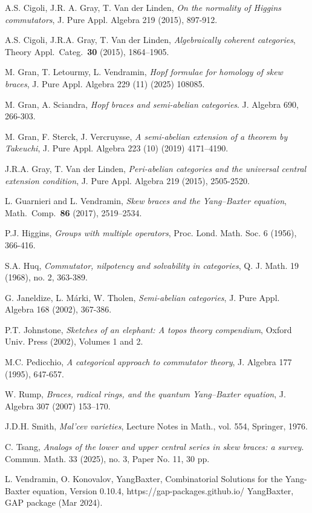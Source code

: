 \documentclass{amsart}
\theoremstyle{definition}
\begin{document}
\begin{thebibliography}{}
A.S. Cigoli, J.R. A. Gray, T. Van der Linden, 
\emph{On the normality of Higgins commutators}, J. Pure Appl. Algebra 219 (2015), 897-912.

A.S. Cigoli, J.R.A. Gray, T. Van der Linden,
\emph{Algebraically coherent categories},
Theory Appl.\ Categ.\ \textbf{30} (2015), 1864--1905.

M. Gran, T. Letourmy, L. Vendramin, 
\emph{Hopf formulae for homology of skew braces}, J. Pure Appl. Algebra 229 (11) (2025) 108085.

M. Gran, A. Sciandra, 
\emph{Hopf braces and semi-abelian categories}. J. Algebra 690, 266-303.

M. Gran, F. Sterck, J. Vercruysse, \emph{A semi-abelian extension of a theorem by Takeuchi}, J. Pure
Appl. Algebra 223 (10) (2019) 4171--4190.

J.R.A. Gray, T. Van der Linden,
\emph{Peri-abelian categories and the universal central extension condition}, J. Pure Appl. Algebra 219 (2015), 2505-2520.

L. Guarnieri and L. Vendramin,
\emph{Skew braces and the Yang--Baxter equation},
Math.\ Comp.\ \textbf{86} (2017), 2519--2534.

P.J. Higgins,
\emph{Groups with multiple operators}, Proc. Lond. Math. Soc. 6 (1956), 366-416.

S.A. Huq, 
\emph{Commutator, nilpotency and solvability in categories}, Q. J. Math. 19 (1968), no. 2, 363-389.

G. Janeldize, L. Márki, W. Tholen,
\emph{Semi-abelian categories}, J. Pure Appl. Algebra 168 (2002), 367-386.

P.T. Johnstone,
\emph{Sketches of an elephant: A topos theory compendium}, Oxford Univ. Press (2002), Volumes 1 and 2.


M.C. Pedicchio, 
\emph{A categorical approach to commutator theory}, J. Algebra 177 (1995), 647-657.

W. Rump, 
\emph{Braces, radical rings, and the quantum Yang–Baxter equation}, J. Algebra 307 (2007)
153--170.

J.D.H. Smith, 
\emph{Mal'cev varieties}, Lecture Notes in Math., vol. 554, Springer, 1976.

C. Tsang, 
\emph{Analogs of the lower and upper central series in skew braces: a survey}. Commun. Math. 33 (2025),
no. 3, Paper No. 11, 30 pp.

L. Vendramin, O. Konovalov, YangBaxter, Combinatorial Solutions for the Yang-Baxter equation, Version 0.10.4, https://gap-packages.github.io/ YangBaxter, GAP package (Mar 2024).


\end{thebibliography}
\end{document}
